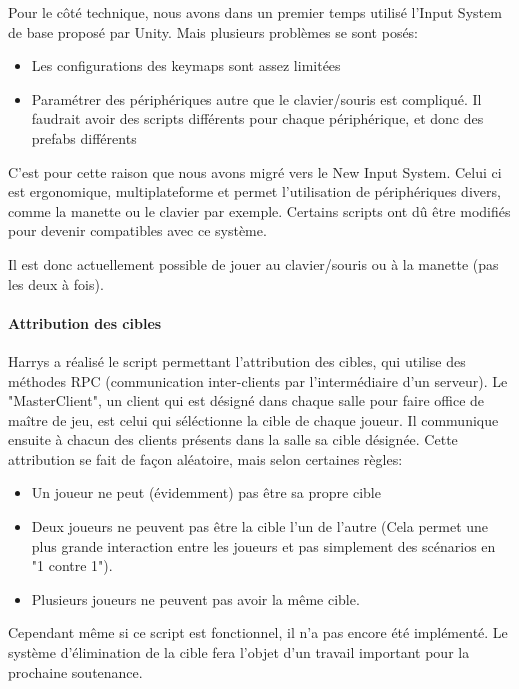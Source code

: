             Pour le côté technique, nous avons dans un premier temps utilisé l'Input System de base proposé par Unity. Mais plusieurs problèmes se sont posés:
            \begin{itemize}
                \item Les configurations des keymaps sont assez limitées
                \item Paramétrer des périphériques autre que le clavier/souris est compliqué. Il faudrait avoir des scripts différents pour chaque périphérique, et donc des prefabs différents
            \end{itemize}
            C'est pour cette raison que nous avons migré vers le New Input System.
            Celui ci est ergonomique, multiplateforme et permet l'utilisation de périphériques divers, comme la manette ou le clavier par exemple.
            Certains scripts ont dû être modifiés pour devenir compatibles avec ce système.

            Il est donc actuellement possible de jouer au clavier/souris ou à la manette (pas les deux à fois).
            
        \paragraph{Attribution des cibles}
            
            Harrys a réalisé le script permettant l'attribution des cibles, qui utilise des méthodes RPC (communication inter-clients par l'intermédiaire d'un serveur). Le "MasterClient", un client qui est désigné dans chaque salle pour faire office de maître de jeu, est celui qui séléctionne la cible de chaque joueur. Il communique ensuite à chacun des clients présents dans la salle sa cible désignée. Cette attribution se fait de façon aléatoire, mais selon certaines règles:
            \begin{itemize}
                \item Un joueur ne peut (évidemment) pas être sa propre cible
                \item Deux joueurs ne peuvent pas être la cible l'un de l'autre (Cela permet une plus grande interaction entre les joueurs et pas simplement des scénarios en "1 contre 1").
                \item Plusieurs joueurs ne peuvent pas avoir la même cible.
            \end{itemize}
                
            Cependant même si ce script est fonctionnel, il n'a pas encore été implémenté. 
            Le système d'élimination de la cible fera l'objet d'un travail important pour la prochaine soutenance.
        
